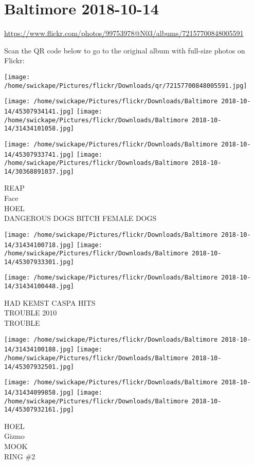 \documentclass[10pt,letterpaper]{article}
\title{}
\author{}
\date{}
\begin{document}
\section*{Baltimore 2018-10-14}

\url{https://www.flickr.com/photos/99753978@N03/albums/72157700848005591}

Scan the QR code below to go to the original album with full-size photos on Flickr:

\texttt{[image: /home/swickape/Pictures/flickr/Downloads/qr/72157700848005591.jpg]}
\pagebreak

\texttt{[image: /home/swickape/Pictures/flickr/Downloads/Baltimore 2018-10-14/45307934141.jpg]}
\texttt{[image: /home/swickape/Pictures/flickr/Downloads/Baltimore 2018-10-14/31434101058.jpg]}

\texttt{[image: /home/swickape/Pictures/flickr/Downloads/Baltimore 2018-10-14/45307933741.jpg]}
\texttt{[image: /home/swickape/Pictures/flickr/Downloads/Baltimore 2018-10-14/30368891037.jpg]}

REAP\\
Face\\
HOEL\\
DANGEROUS DOGS BITCH FEMALE DOGS
\pagebreak

\texttt{[image: /home/swickape/Pictures/flickr/Downloads/Baltimore 2018-10-14/31434100718.jpg]}
\texttt{[image: /home/swickape/Pictures/flickr/Downloads/Baltimore 2018-10-14/45307933301.jpg]}

\vspace{0.25in}
\texttt{[image: /home/swickape/Pictures/flickr/Downloads/Baltimore 2018-10-14/31434100448.jpg]}

HAD KEMST CASPA HITS\\
TROUBLE 2010\\
TROUBLE
\pagebreak

\texttt{[image: /home/swickape/Pictures/flickr/Downloads/Baltimore 2018-10-14/31434100188.jpg]}
\texttt{[image: /home/swickape/Pictures/flickr/Downloads/Baltimore 2018-10-14/45307932501.jpg]}

\texttt{[image: /home/swickape/Pictures/flickr/Downloads/Baltimore 2018-10-14/31434099858.jpg]}
\texttt{[image: /home/swickape/Pictures/flickr/Downloads/Baltimore 2018-10-14/45307932161.jpg]}

HOEL\\
Gizmo\\
MOOK\\
RING \#2
\pagebreak
\end{document}
